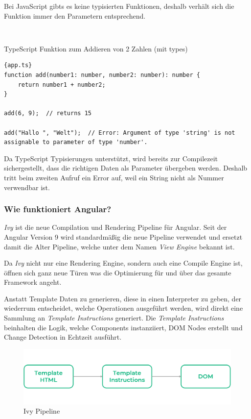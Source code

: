 Bei JavaScript gibts es keine typisierten Funktionen, deshalb verhält sich die Funktion immer den Parametern entsprechend.

\

TypeScript Funktion zum Addieren von 2 Zahlen (mit types)
\begin{lstlisting}[label={lst:add-function-ts}]{app.ts}
function add(number1: number, number2: number): number {
    return number1 + number2;
}
    
add(6, 9);  // returns 15

add("Hallo ", "Welt");  // Error: Argument of type 'string' is not assignable to parameter of type 'number'.
\end{lstlisting}

Da TypeScript Typisierungen unterstützt, wird bereits zur Compilezeit sichergestellt, dass die richtigen Daten als Parameter übergeben werden.
Deshalb tritt beim zweiten Aufruf ein Error auf, weil ein String nicht als Nummer verwendbar ist.

\cite{typescript-landing-page, what-is-typescript}

\subsubsection{Wie funktioniert Angular?}
\emph{Ivy} ist die neue Compilation und Rendering Pipeline für Angular.
Seit der Angular Version 9 wird standardmäßig die neue Pipeline verwendet und ersetzt damit die Alter Pipeline,
welche unter dem Namen \emph{View Engine} bekannt ist.

Da \emph{Ivy} nicht nur eine Rendering Engine, sondern auch eine Compile Engine ist, öffnen sich ganz neue Türen was die
Optimierung für und über das gesamte Framework angeht.

Anstatt Template Daten zu generieren, diese in einen Interpreter zu geben, der wiederrum entscheidet, welche Operationen
ausgeführt werden, wird direkt eine Sammlung an \emph{Template Instructions} generiert.
Die \emph{Template Instructions} beinhalten die Logik, welche Components instanziiert, DOM Nodes erstellt und Change Detection in Echtzeit ausführt.

\begin{figure}[hbt!]
    \centering
    \includegraphics[scale=.4]{pics/ivy-pipeline}
    \caption{Ivy Pipeline}
    \label{fig:ivy-pipeline}
\end{figure}

